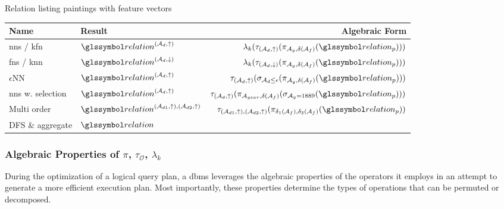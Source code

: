 \begin{example}[label=example:rel_painting_w_features]{Relation listing paintings with feature vectors}{}
    \begin{center}
        \begin{tabular}{||l l r ||} 
         \hline
         Name & Result & Algebraic Form \\
         \hline\hline
         \acrshort{nns} / \acrshort{kfn} & $\relation^{(\mathcal{A}_d,\uparrow)}$ & $\lambda_k (\tau_{(\mathcal{A}_d,\uparrow)} ( \pi_{\mathcal{A}_{y}, \delta(\mathcal{A}_{f})}  ( \relation_p)))$  \\ 
         \hline
         \acrshort{fns} / \acrshort{knn}& $\relation^{(\mathcal{A}_d,\downarrow)}$ & $\lambda_k (\tau_{(\mathcal{A}_d,\downarrow)} ( \pi_{\mathcal{A}_{y}, \delta(\mathcal{A}_{f})}  ( \relation_p)))$   \\
         \hline
         $\epsilon$NN~\cite{Giangreco:2018thesis} & $\relation^{(\mathcal{A}_d,\uparrow)}$ & $\tau_{(\mathcal{A}_d,\uparrow)} ( \sigma_{\mathcal{A}_d \leq \epsilon} ( \pi_{\mathcal{A}_{y}, \delta(\mathcal{A}_{f})} ( \relation_p)) )$  \\
         \hline
         \acrshort{nns} w. selection & $\relation^{(\mathcal{A}_d,\uparrow)}$ &  $\tau_{(\mathcal{A}_d,\uparrow)} ( \pi_{\mathcal{A}_{year}, \delta(\mathcal{A}_{f})} ( \sigma_{\mathcal{A}_{y} = 1889} ( \relation_p)) )$\\
         \hline
         Multi order & $\relation^{(\mathcal{A}_{d1},\uparrow),(\mathcal{A}_{d2},\uparrow)}$ & $\tau_{(\mathcal{A}_{d1},\uparrow),(\mathcal{A}_{d2},\uparrow)} ( \pi_{\delta_1(\mathcal{A}_{f}), \delta_2(\mathcal{A}_{f})}  ( \relation_p))$ \\ 
         \hline
         DFS \& aggregate & $\relation$ & \\ 
         \hline
        \end{tabular}
    \end{center}

\end{example}

\subsubsection{Algebraic Properties of  \texorpdfstring{$\pi$}{Pi}, \texorpdfstring{$\tau_{\mathcal{O}}$}{Tau}, \texorpdfstring{$\lambda_k$}{Lambda}}

During the optimization of a logical query plan, a \acrshort{dbms} leverages the algebraic properties of the operators it employs in an attempt to generate a more efficient execution plan. Most importantly, these properties determine the types of operations that can be permuted or decomposed. 

